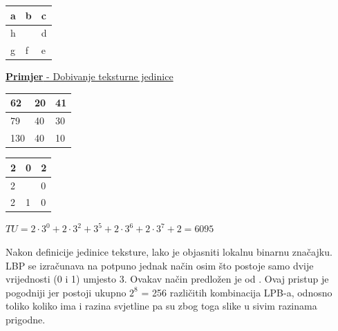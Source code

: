 \documentclass[times, utf8, zavrsni, numeric]{fer}
\begin{document}
\begin{minipage}{\linewidth}
\centering
\begin{tabularx}{0.25\textwidth}{| X | X | X |}
\hline
a & b & c \\ 
\hline
h &  & d  \\ 
\hline
g & f & e  \\
\hline
\end{tabularx}
\end{minipage}

\vspace{0.7cm}

\underline{\textbf{Primjer} - Dobivanje teksturne jedinice}

\bigbreak

\begin{minipage}{\linewidth}
\centering
\begin{tabularx}{0.25\textwidth}{| X | X | X |}
\hline
62 & 20 & 41 \\ 
\hline
79 & 40 & 30 \\ 
\hline
130 & 40 & 10 \\
\hline
\end{tabularx}
\end{minipage}

\bigbreak

\begin{minipage}{\linewidth}
\centering
\begin{tabularx}{0.25\textwidth}{| X | X | X |}
\hline
2 & 0 & 2 \\ 
\hline
2 &  & 0 \\ 
\hline
2 & 1 & 0 \\
\hline
\end{tabularx}
\end{minipage}


\begin{center}
\(TU = 2 \cdot 3^0 + 2 \cdot 3^2 + 3^5 + 2 \cdot 3^6 + 2 \cdot 3^7 + 2  = 6095\)
\end{center}

\medskip

Nakon definicije jedinice teksture, lako je objasniti lokalnu binarnu značajku. 
LBP se izračunava na potpuno jednak način osim što postoje samo dvije vrijednosti 
(0 i 1) umjesto 3. Ovakav način predložen je od \citep{ojala}. Ovaj 
pristup je pogodniji jer postoji ukupno \(2^8\)  = 256 različitih kombinacija LPB-a, 
odnosno toliko koliko ima i razina svjetline pa su zbog toga slike u sivim 
razinama prigodne.
\end{document}
